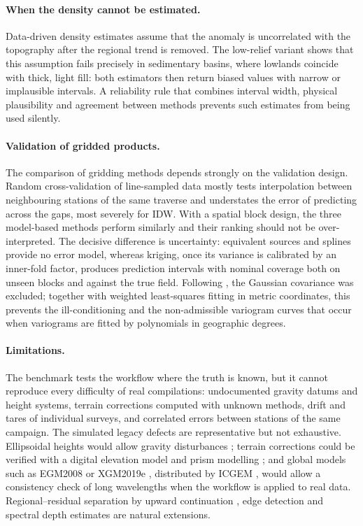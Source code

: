 \documentclass[11pt,a4paper]{article}
\begin{document}
\paragraph{When the density cannot be estimated.} Data-driven density estimates assume that the anomaly is uncorrelated with the topography after the regional trend is removed. The low-relief variant shows that this assumption fails precisely in sedimentary basins, where lowlands coincide with thick, light fill: both estimators then return biased values with narrow or implausible intervals. A reliability rule that combines interval width, physical plausibility and agreement between methods prevents such estimates from being used silently.

\paragraph{Validation of gridded products.} The comparison of gridding methods depends strongly on the validation design. Random cross-validation of line-sampled data mostly tests interpolation between neighbouring stations of the same traverse and understates the error of predicting across the gaps, most severely for IDW. With a spatial block design, the three model-based methods perform similarly and their ranking should not be over-interpreted. The decisive difference is uncertainty: equivalent sources and splines provide no error model, whereas kriging, once its variance is calibrated by an inner-fold factor, produces prediction intervals with nominal coverage both on unseen blocks and against the true field. Following \citet{Stein1999}, the Gaussian covariance was excluded; together with weighted least-squares fitting in metric coordinates, this prevents the ill-conditioning and the non-admissible variogram curves that occur when variograms are fitted by polynomials in geographic degrees.

\paragraph{Limitations.} The benchmark tests the workflow where the truth is known, but it cannot reproduce every difficulty of real compilations: undocumented gravity datums and height systems, terrain corrections computed with unknown methods, drift and tares of individual surveys, and correlated errors between stations of the same campaign. The simulated legacy defects are representative but not exhaustive. Ellipsoidal heights would allow gravity disturbances \citep{LiGotze2001,HackneyFeatherstone2003}; terrain corrections could be verified with a digital elevation model and prism modelling \citep{Nagy2000}; and global models such as EGM2008 \citep{Pavlis2012} or XGM2019e \citep{Zingerle2020}, distributed by ICGEM \citep{Ince2019}, would allow a consistency check of long wavelengths when the workflow is applied to real data. Regional--residual separation by upward continuation \citep{Jacobsen1987}, edge detection \citep{BlakelySimpson1986} and spectral depth estimates \citep{SpectorGrant1970} are natural extensions.
\end{document}
